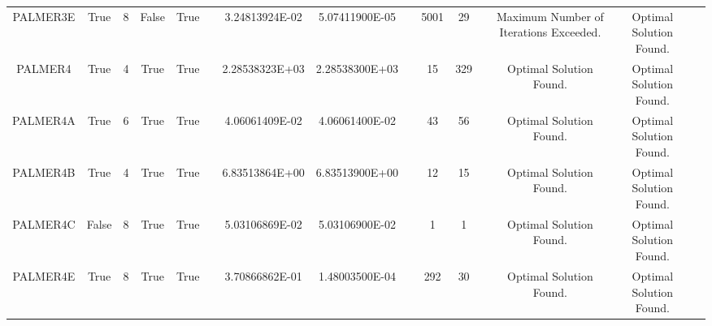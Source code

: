 \begin{longtable}{ccccccccccccccc}
	\cellcolor{default2} PALMER3E& \cellcolor{default2} True& \cellcolor{default2} 8& \cellcolor{default2} False& \cellcolor{default2} True& \cellcolor{header} & \cellcolor{poor} 3.24813924E-02& \cellcolor{best} 5.07411900E-05& \cellcolor{header} & \cellcolor{poor} 5001& \cellcolor{best} 29& \cellcolor{header} & \cellcolor{default2} Maximum Number of Iterations Exceeded.& \cellcolor{default2} Optimal Solution Found.& \cellcolor{header} \\
	\cellcolor{default1} PALMER4& \cellcolor{default1} True& \cellcolor{default1} 4& \cellcolor{default1} True& \cellcolor{default1} True& \cellcolor{header} & \cellcolor{ok} 2.28538323E+03& \cellcolor{best} 2.28538300E+03& \cellcolor{header} & \cellcolor{best} 15& \cellcolor{poor} 329& \cellcolor{header} & \cellcolor{default1} Optimal Solution Found.& \cellcolor{default1} Optimal Solution Found.& \cellcolor{header} \\
	\cellcolor{default2} PALMER4A& \cellcolor{default2} True& \cellcolor{default2} 6& \cellcolor{default2} True& \cellcolor{default2} True& \cellcolor{header} & \cellcolor{ok} 4.06061409E-02& \cellcolor{best} 4.06061400E-02& \cellcolor{header} & \cellcolor{best} 43& \cellcolor{ok} 56& \cellcolor{header} & \cellcolor{default2} Optimal Solution Found.& \cellcolor{default2} Optimal Solution Found.& \cellcolor{header} \\
	\cellcolor{default1} PALMER4B& \cellcolor{default1} True& \cellcolor{default1} 4& \cellcolor{default1} True& \cellcolor{default1} True& \cellcolor{header} & \cellcolor{best} 6.83513864E+00& \cellcolor{ok} 6.83513900E+00& \cellcolor{header} & \cellcolor{best} 12& \cellcolor{ok} 15& \cellcolor{header} & \cellcolor{default1} Optimal Solution Found.& \cellcolor{default1} Optimal Solution Found.& \cellcolor{header} \\
	\cellcolor{default2} PALMER4C& \cellcolor{default2} False& \cellcolor{default2} 8& \cellcolor{default2} True& \cellcolor{default2} True& \cellcolor{header} & \cellcolor{best} 5.03106869E-02& \cellcolor{ok} 5.03106900E-02& \cellcolor{header} & \cellcolor{best} 1& \cellcolor{best} 1& \cellcolor{header} & \cellcolor{default2} Optimal Solution Found.& \cellcolor{default2} Optimal Solution Found.& \cellcolor{header} \\
	\cellcolor{default1} PALMER4E& \cellcolor{default1} True& \cellcolor{default1} 8& \cellcolor{default1} True& \cellcolor{default1} True& \cellcolor{header} & \cellcolor{poor} 3.70866862E-01& \cellcolor{best} 1.48003500E-04& \cellcolor{header} & \cellcolor{poor} 292& \cellcolor{best} 30& \cellcolor{header} & \cellcolor{default1} Optimal Solution Found.& \cellcolor{default1} Optimal Solution Found.& \cellcolor{header} \\

\end{longtable}
